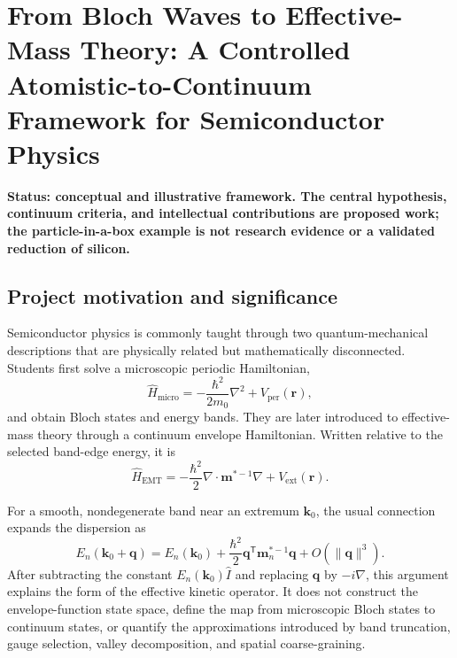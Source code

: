 \chapter[From Bloch Waves to Effective-Mass Theory]{From Bloch Waves to
Effective-Mass Theory: A Controlled Atomistic-to-Continuum Framework for
Semiconductor Physics}
\label{ch:operator-reduction-motivation}

\textbf{Status: conceptual and illustrative framework. The central hypothesis,
continuum criteria, and intellectual contributions are proposed work; the
particle-in-a-box example is not research evidence or a validated reduction of
silicon.}

\section{Project motivation and significance}

Semiconductor physics is commonly taught through two quantum-mechanical
descriptions that are physically related but mathematically disconnected.
Students first solve a microscopic periodic Hamiltonian,
\begin{equation}
    \hat H_{\mathrm{micro}}
    =
    -\frac{\hbar^2}{2m_0}\nabla^2
    +
    V_{\mathrm{per}}(\mathbf r),
\end{equation}
and obtain Bloch states and energy bands. They are later introduced to
effective-mass theory through a continuum envelope Hamiltonian. Written
relative to the selected band-edge energy, it is
\begin{equation}
    \hat H_{\mathrm{EMT}}
    =
    -\frac{\hbar^2}{2}
    \nabla\mathbin{\cdot}\mathbf m^{*-1}\nabla
    +
    V_{\mathrm{ext}}(\mathbf r).
\end{equation}

For a smooth, nondegenerate band near an extremum $\mathbf k_0$, the usual
connection expands the dispersion as
\begin{equation}
    E_n(\mathbf k_0+\mathbf q)
    =
    E_n(\mathbf k_0)
    +
    \frac{\hbar^2}{2}
    \mathbf q^{\mathsf T}\mathbf m_n^{*-1}\mathbf q
    +
    O\!\left(\lVert\mathbf q\rVert^3\right).
\end{equation}
After subtracting the constant $E_n(\mathbf k_0)\hat I$ and replacing
$\mathbf q$ by $-i\nabla$, this argument explains the form of the effective
kinetic operator. It does not construct the envelope-function state space,
define the map from microscopic Bloch states to continuum states, or quantify
the approximations introduced by band truncation, gauge selection, valley
decomposition, and spatial coarse-graining.

